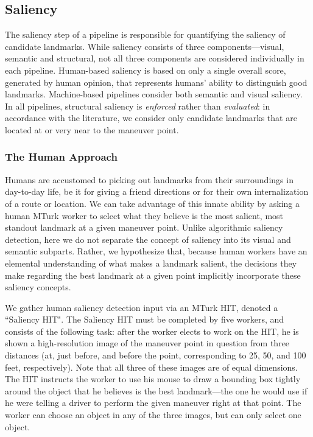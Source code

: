 \subsection{Saliency}
The saliency step of a pipeline is responsible for quantifying the saliency of candidate landmarks. While saliency consists of three components---visual, semantic and structural, not all three components are considered individually in each pipeline. Human-based saliency is based on only a single overall score, generated by human opinion, that represents humans' ability to distinguish good landmarks. Machine-based pipelines consider both semantic and visual saliency. In all pipelines, structural saliency is \textit{enforced} rather than \textit{evaluated}: in accordance with the literature, we consider only candidate landmarks that are located at or very near to the maneuver point.

\subsubsection{The Human Approach}\label{Sect:sal:human}
Humans are accustomed to picking out landmarks from their surroundings in day-to-day life, be it for giving a friend directions or for their own internalization of a route or location. We can take advantage of this innate ability by asking a human MTurk worker to select what they believe is the most salient, most standout landmark at a given maneuver point. Unlike algorithmic saliency detection, here we do not separate the concept of saliency into its visual and semantic subparts. Rather, we hypothesize that, because human workers have an elemental understanding of what makes a landmark salient, the decisions they make regarding the best landmark at a given point implicitly incorporate these saliency concepts.

We gather human saliency detection input via an MTurk HIT, denoted a ``Saliency HIT". The Saliency HIT must be completed by five workers, and consists of the following task: after the worker elects to work on the HIT, he is shown a high-resolution image of the maneuver point in question from three distances (at, just before, and before the point, corresponding to 25, 50, and 100 feet, respectively). Note that all three of these images are of equal dimensions. The HIT instructs the worker to use his mouse to draw a bounding box tightly around the object that he believes is the best landmark---the one he would use if he were telling a driver to perform the given maneuver right at that point. The worker can choose an object in any of the three images, but can only select one object.

